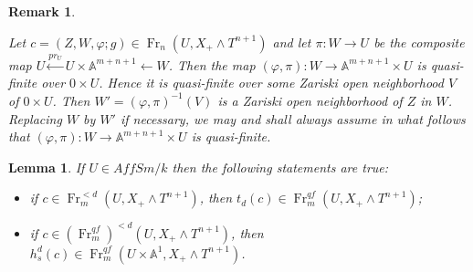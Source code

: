 \documentclass[a4paper,11pt,reqno]{amsart}
\newtheorem{lemma}[theorem]{Lemma}
\newtheorem{remark}[theorem]{Remark}
\begin{document}
\begin{remark}\label{r:quasi-finite}{\rm
Let $c=(Z,W,{\varphi};g)\in {\operatorname{Fr}}_n(U,X_+\wedge T^{n+1})$ and let $\pi:
W\to U$ be the composite map $U\xleftarrow{pr_U} U\times
{\mathbb{A}}^{m+n+1}\leftarrow W$. Then the map $({\varphi},\pi)\colon
W\to{\mathbb{A}}^{m+n+1}\times U$ is quasi-finite over $0\times U$. Hence it
is quasi-finite over some Zariski open neighborhood $V$ of $0\times
U$. Then $W'=({\varphi},\pi)^{-1}(V)$ is a Zariski open neighborhood of
$Z$ in $W$. Replacing $W$ by $W'$ if necessary, we may and shall
always assume in what follows that $({\varphi},\pi): W\to
{\mathbb{A}}^{m+n+1}\times U$ is quasi-finite.

}\end{remark}

\begin{lemma}\label{l:homotopy_properties}
If $U\in AffSm/k$ then the following statements are true:
\begin{itemize}
\item [(i)] if $c \in {\operatorname{Fr}}^{<d}_m(U,X_+\wedge T^{n+1})$, then $t_d(c) \in {\operatorname{Fr}}^{qf}_m(U,X_+\wedge T^{n+1})$;
\item [(ii)] if $c \in ({\operatorname{Fr}}^{qf}_m)^{<d}(U,X_+\wedge T^{n+1})$, then $h^d_s(c) \in {\operatorname{Fr}}^{qf}_m(U\times {\mathbb{A}}^1,X_+\wedge
T^{n+1})$.
\end{itemize}
\end{lemma}
\end{document}
